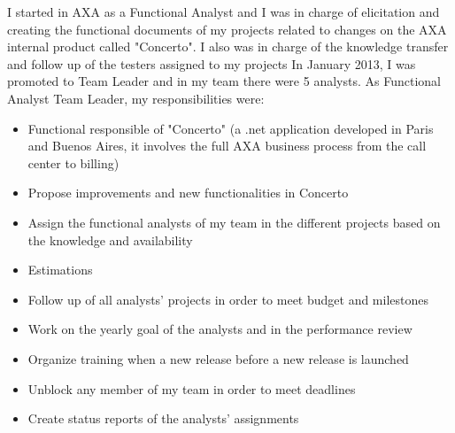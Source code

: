 \documentclass[11pt,a4paper,sans]{moderncv}
\begin{document}
{
I started in AXA as a Functional Analyst and I was in charge of elicitation and creating the functional documents of my projects related to changes on the AXA internal product called "Concerto". I also was in charge of the knowledge transfer and follow up of the testers assigned to my projects
\newline{}
In January 2013, I was promoted to Team Leader and in my team there were 5 analysts.
\newline{}
}
{ As Functional Analyst Team Leader, my responsibilities were:
}
\begin{itemize}
  \item Functional responsible of "Concerto" (a .net application developed in Paris and Buenos Aires, it involves the full AXA business process from the call center to billing)
  \item Propose improvements and new functionalities in Concerto
  \item Assign the functional analysts of my team in the different projects based on the knowledge and availability
  \item Estimations
  \item Follow up of all analysts' projects in order to meet budget and milestones
  \item Work on the yearly goal of the analysts and in the performance review
  \item Organize training when a new release before a new release is launched
  \item Unblock any member of my team in order to meet deadlines
  \item Create status reports of the analysts' assignments
\newline{}
\end{itemize}




\end{document}
